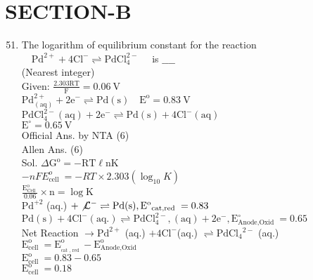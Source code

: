 \documentclass[10pt]{article}
\begin{document}
\section*{SECTION-B}
\begin{enumerate}
  \setcounter{enumi}{50}
  \item The logarithm of equilibrium constant for the reaction \(\quad \mathrm{Pd}^{2+}+4 \mathrm{Cl}^{-} \rightleftharpoons \mathrm{PdCl}_{4}^{2-} \quad\) is \(\_\_\_\_\)\\
(Nearest integer)\\
Given: \(\frac{2.303 \mathrm{RT}}{\mathrm{F}}=0.06 \mathrm{~V}\)\\
\(\mathrm{Pd}_{(\mathrm{aq})}^{2+}+2 \mathrm{e}^{-} \rightleftharpoons \mathrm{Pd}(\mathrm{s}) \quad \mathrm{E}^{\mathrm{o}}=0.83 \mathrm{~V}\)\\
\(\mathrm{PdCl}_{4}^{2-}(\mathrm{aq})+2 \mathrm{e}^{-} \rightleftharpoons \mathrm{Pd}(\mathrm{s})+4 \mathrm{Cl}^{-}(\mathrm{aq})\)\\
\(\mathrm{E}^{\circ}=0.65 \mathrm{~V}\)\\
Official Ans. by NTA (6)\\
Allen Ans. (6)\\
Sol. \(\Delta \mathrm{G}^{\mathrm{o}}=-\mathrm{RT} \ell \mathrm{nK}\)\\
\(-n F E_{\text {cell }}^{o}=-R T \times 2.303\left(\log _{10} K\right)\)\\
\(\frac{\mathrm{E}_{\text {Cell }}^{\mathrm{o}}}{0.06} \times \mathrm{n}=\log \mathrm{K}\)\\
\(\mathrm{Pd}^{+2}\) (aq.) \(+\not \mathcal{L}^{-} \rightleftharpoons \mathrm{Pd}(\mathrm{s}), \mathrm{E}^{\mathrm{o}}{ }_{\text {cat,red }}=0.83\)\\
\(\mathrm{Pd}(\mathrm{s})+4 \mathrm{Cl}^{-}(\mathrm{aq}.) \rightleftharpoons \mathrm{PdCl}_{4}^{2-},(\mathrm{aq})+2 \mathrm{e}^{-}, \mathrm{E}_{\text {Anode,Oxid }}^{\circ}=0.65\)\\
Net Reaction \(\rightarrow \mathrm{Pd}^{2+}\) (aq.) \(+4 \mathrm{Cl}^{-}\)(aq.) \(\rightleftharpoons \mathrm{PdCl}_{4}{ }^{2-}\) (aq.)\\
\(\mathrm{E}_{\text {cell }}^{\mathrm{o}}=\mathrm{E}_{{ }_{\text {cat }, \text { red }}}^{\mathrm{o}}-\mathrm{E}_{\text {Anode,Oxid }}^{\mathrm{o}}\)\\
\(\mathrm{E}_{\text {cell }}^{\mathrm{o}}=0.83-0.65\)\\
\(\mathrm{E}_{\text {cell }}^{\mathrm{o}}=0.18\)
\end{enumerate}
\end{document}
